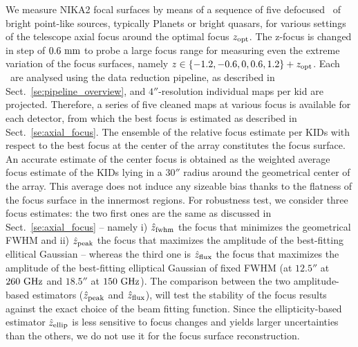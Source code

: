We measure NIKA2 focal surfaces by means of a sequence of five
defocused \bms\ of bright
point-like sources, typically Planets or bright quasars, for various settings of
the telescope axial focus around the optimal focus $z_{\rm{opt}}$.
The z-focus is changed in step of $0.6~\rm{mm}$ to probe a large
focus range for measuring even the extreme variation of the focus surfaces,
namely $z \in \{-1.2, -0.6, 0, 0.6, 1.2 \} + z_{\rm{opt}}$.  Each
\bm\ are analysed using the data reduction pipeline, as described in
Sect.~\ref{se:pipeline_overview}, and $4''$-resolution individual maps per kid
are projected. %
Therefore, a series of
five cleaned maps at various focus is available for each detector, from which
the best focus is estimated as described in Sect.~\ref{se:axial_focus}. The
ensemble of the relative focus estimate per KIDs with respect to the best focus
at the center of the array constitutes the focus surface. An accurate estimate
of the center focus is obtained as the weighted average focus estimate of the
KIDs lying in a $30''$ radius around the geometrical center of the array. This
average does not induce any sizeable bias thanks to the flatness of the focus
surface in the innermost regions. For robustness test, we consider three focus
estimates: the two first ones are the same as discussed in
Sect.~\ref{se:axial_focus} -- namely i) $\hat z_{\rm{fwhm}}$ the focus that
minimizes the geometrical FWHM and ii) $\hat z_{\rm{peak}}$ the focus that
maximizes the amplitude of the best-fitting ellitical Gaussian -- whereas the
third one is $\hat z_{\rm{flux}}$ the focus that maximizes the amplitude of the
best-fitting elliptical Gaussian of fixed FWHM (at $12.5''$ at $260~\rm{GHz}$ and
$18.5''$ at $150~\rm{GHz}$). The comparison between the two amplitude-based
estimators ($\hat z_{\rm{peak}}$ and $\hat z_{\rm{flux}}$), will test the
stability of the focus results against the exact choice of the beam fitting
function. Since the ellipticity-based estimator $\hat z_{\rm{ellip}}$ is less
sensitive to focus changes and yields larger uncertainties than the others, we
do not use it for the focus surface reconstruction.


